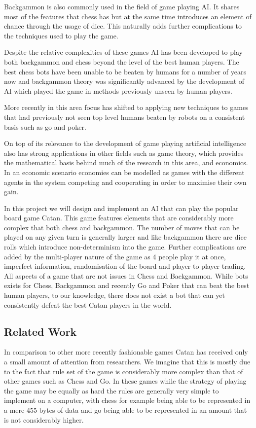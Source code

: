 \documentclass[]{article}
\begin{document}
\par Backgammon is also commonly used in the field of game playing AI. It shares most of the features that chess has but at the same time introduces an element of chance through the usage of dice. This naturally adds further complications to the techniques used to play the game.

\par Despite the relative complexities of these games AI has been developed to play both backgammon and chess beyond the level of the best human players. The best chess bots have been unable to be beaten by humans for a number of years now and backgammon theory was significantly advanced by the development of AI which played the game in methods previously unseen by human players.

\par More recently in this area focus has shifted to applying new techniques to games that had previously not seen top level humans beaten by robots on a consistent basis such as go and poker.

\par On top of its relevance to the development of game playing artificial intelligence also has strong applications in other fields such as game theory, which provides the mathematical basis behind much of the research in this area, and economics. In an economic scenario economies can be modelled as games with the different agents in the system competing and cooperating in order to maximise their own gain.

\par In this project we will design and implement an AI that can play the popular board game Catan. This game features elements that are considerably more complex that both chess and backgammon. The number of moves that can be played on any given turn is generally larger and like backgammon there are dice rolls which introduce non-determinism into the game. Further complications are added by the multi-player nature of the game as 4 people play it at once, imperfect information, randomisation of the board and player-to-player trading. All aspects of a game that are not issues in Chess and Backgammon. While bots exists for Chess, Backgammon and recently Go and Poker that can beat the best human players, to our knowledge, there does not exist a bot that can yet consistently defeat the best Catan players in the world.
 
\subsection{Related Work}
In comparison to other more recently fashionable games Catan has received only a small amount of attention from researchers. We imagine that this is mostly due to the fact that rule set of the game is considerably more complex than that of other games such as Chess and Go. In these games while the strategy of playing the game may be equally as hard the rules are generally very simple to implement on a computer, with chess for example being able to be represented in a mere 455 bytes of data and go being able to be represented in an amount that is not considerably higher.
\end{document}

